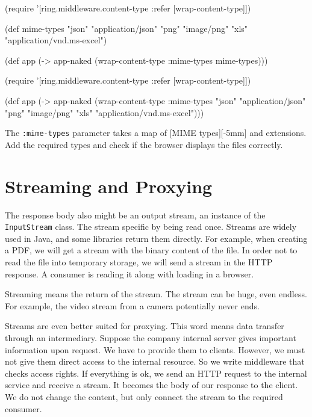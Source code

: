 \ifx\DEVICETYPE\MOBILE

\begin{english}
  \begin{clojure}
(require '[ring.middleware.content-type
           :refer [wrap-content-type]])

(def mime-types
      {"json" "application/json"
       "png" "image/png"
       "xls" "application/vnd.ms-excel"})

(def app
  (-> app-naked
      (wrap-content-type
        {:mime-types mime-types})))
  \end{clojure}
\end{english}

\else

\begin{english}
  \begin{clojure}
(require '[ring.middleware.content-type
           :refer [wrap-content-type]])

(def app
  (-> app-naked
      (wrap-content-type
       {:mime-types
         {"json" "application/json"
          "png" "image/png"
          "xls" "application/vnd.ms-excel"}})))
  \end{clojure}
\end{english}

\fi

The \verb|:mime-types| parameter takes a map of [MIME types][-5mm] and extensions. Add the required types and check if the browser displays the files correctly.


\section{Streaming and Proxying}

The response body also might be an output stream, an instance of the \verb|InputStream| class. The stream specific by being read once. Streams are widely used in Java, and some libraries return them directly. For example, when creating a PDF, we will get a stream with the binary content of the file. In order not to read the file into temporary storage, we will send a stream in the HTTP response. A consumer is reading it along with loading in a browser.

Streaming means the return of the stream. The stream can be huge, even endless. For example, the video stream from a camera potentially never ends.

Streams are even better suited for proxying. This word means data transfer through an intermediary. Suppose the company internal server gives important information upon request. We have to provide them to clients. However, we must not give them direct access to the internal resource. So we write middleware that checks access rights. If everything is ok, we send an HTTP request to the internal service and receive a stream. It becomes the body of our response to the client. We do not change the content, but only connect the stream to the required consumer.


